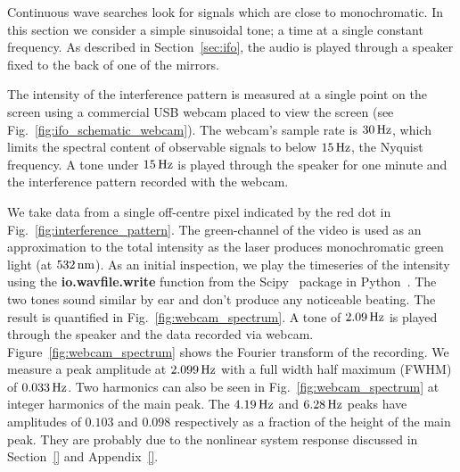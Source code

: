 \documentclass[paper-main.tex]{subfiles}
\begin{document}

Continuous wave searches look for signals which are close to monochromatic. 
In this section we consider a simple sinusoidal tone; a time at a single constant frequency. 
As described in Section~\ref{sec:ifo}, the audio is played through a speaker fixed to the back of one of the mirrors.


The intensity of the interference pattern is measured at a single point on the screen using a commercial USB webcam placed to view the screen (see Fig.~\ref{fig:ifo_schematic_webcam}). 
The webcam's sample rate is $30\,{\rm Hz}$, which limits the spectral content of observable signals to below $15\,{\rm Hz}$, the Nyquist frequency.
A tone under $15\,{\rm Hz}$ is played through the speaker for one minute and the interference pattern recorded with the webcam. 


We take data from a single off-centre pixel indicated by the red dot in Fig.~\ref{fig:interference_pattern}. 
The green-channel of the video is used as an approximation to the total intensity as the laser produces monochromatic green light (at $532\,{\rm nm}$).
As an initial inspection, we play the timeseries of the intensity using the \textbf{io.wavfile.write} function from the Scipy~\cite{scipy} package in Python~\cite{python}. 
The two tones sound similar by ear and don't produce any noticeable beating. 
The result is quantified in Fig.~\ref{fig:webcam_spectrum}. 
A tone of $2.09\,{\rm Hz}$ is played through the speaker and the data recorded via webcam. 
Figure~\ref{fig:webcam_spectrum} shows the Fourier transform of the recording.
We measure a peak amplitude at $2.099\,{\rm Hz}$ with a full width half maximum (FWHM) of $0.033\,{\rm Hz}$. 
Two harmonics can also be seen in Fig.~\ref{fig:webcam_spectrum} at integer harmonics of the main peak. 
The $4.19\,{\rm Hz}$ and $6.28\,{\rm Hz}$ peaks have amplitudes of $0.103$ and $0.098$ respectively as a fraction of the height of the main peak. 
They are probably due to the nonlinear system response discussed in Section~\ref{} and Appendix~\ref{}. 
\end{document}
